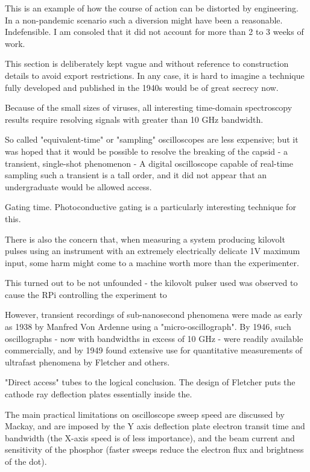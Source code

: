 \documentclass[paper.tex]{subfiles}
\begin{document}
\begin{autem}
This is an example of how the course of action can be distorted by engineering. In a non-pandemic scenario such a diversion might have been a reasonable. Indefensible. I am consoled that it did not account for more than 2 to 3 weeks of work.
\end{autem}


\begin{autem}
	This section is deliberately kept vague and without reference to construction details to avoid export restrictions. In any case, it is hard to imagine a technique fully developed and published in the 1940s would be of great secrecy now. 
\end{autem}

Because of the small sizes of viruses, all interesting time-domain spectroscopy results require resolving signals with greater than 10 GHz bandwidth.

So called "equivalent-time" or "sampling" oscilloscopes are less expensive; but it was hoped that it would be possible to resolve the breaking of the capsid - a transient, single-shot phenomenon -   A digital oscilloscope capable of real-time sampling such a transient is a tall order, and it did not appear that an undergraduate would be allowed access.

Gating time. Photoconductive gating is a particularly interesting technique for this.

There is also the concern that, when measuring a system producing kilovolt pulses using an instrument with an extremely electrically delicate 1V maximum input, some harm might come to a machine worth more than the experimenter. 

This turned out to be not unfounded - the kilovolt pulser used was observed to cause the RPi controlling the experiment to 

However, transient recordings of sub-nanosecond phenomena were made as early as 1938 by Manfred Von Ardenne using a "micro-oscillograph". By 1946, such oscillographs - now with bandwidths in excess of 10 GHz - were readily available commercially\cite{3beam1946}, and by 1949 found extensive use for quantitative measurements of ultrafast phenomena by Fletcher\cite{Production1949} and others. 

"Direct access" tubes to the logical conclusion. The design of Fletcher puts the cathode ray deflection plates essentially inside the.

The main practical limitations on oscilloscope sweep speed are discussed by Mackay\cite{New1948}, and are imposed by the Y axis deflection plate electron transit time and bandwidth (the X-axis speed is of less importance), and the beam current and sensitivity of the phosphor (faster sweeps reduce the electron flux and brightness of the dot).
\end{document}
